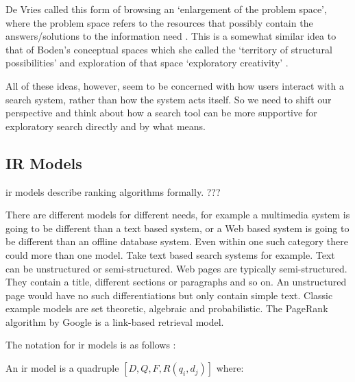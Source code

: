 De Vries called this form of browsing an `enlargement of the problem space', where the problem space refers to the resources that possibly contain the answers/solutions to the information need \autocite{DeVries1993}. This is a somewhat similar idea to that of Boden’s conceptual spaces which she called the `territory of structural possibilities' and exploration of that space `exploratory creativity' \autocite{Boden2003}.

All of these ideas, however, seem to be concerned with how users interact with a search system, rather than how the system acts itself. So we need to shift our perspective and think about how a search tool can be more supportive for exploratory search directly and by what means.


\subsection{IR Models}

\begin{fcom}
  \gls{ir} models describe ranking algorithms formally. ???
\end{fcom}

There are different models for different needs, for example a multimedia system is going to be different than a text based system, or a Web based system is going to be different than an offline database system. Even within one such category there could more than one model. Take text based search systems for example. Text can be unstructured or semi-structured. Web pages are typically semi-structured. They contain a title, different sections or paragraphs and so on. An unstructured page would have no such differentiations but only contain simple text.  Classic example models are set theoretic, algebraic and probabilistic. The PageRank algorithm by Google is a link-based retrieval model.

The notation for \gls{ir} models is as follows \autocite[adapted from][p.58]{Baeza-Yates2011}:

An \gls{ir} model is a quadruple $[D,Q,F,R(q_i, d_j)]$ where:\\
 \\
 \\
 \\
\itab{}    \\
            \\
 \\
            \\
\itab{}     

